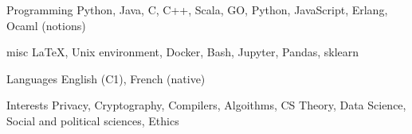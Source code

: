 


\begin{cvskills}
	
	
	\cvskill
	{Programming} %
	{Python, Java, C, C++, Scala, GO, Python, JavaScript, Erlang, Ocaml (notions)} %
	
	
	\cvskill
	{misc} %
	{\LaTeX, Unix environment, Docker, Bash, Jupyter, Pandas, sklearn} %
	
	
	\cvskill
	{Languages} %
	{English (C1), French (native)} %
	
	
	\cvskill
	{Interests} %
	{Privacy, Cryptography, Compilers, Algoithms, CS Theory, Data Science, Social and political sciences, Ethics} %
	
	
\end{cvskills}